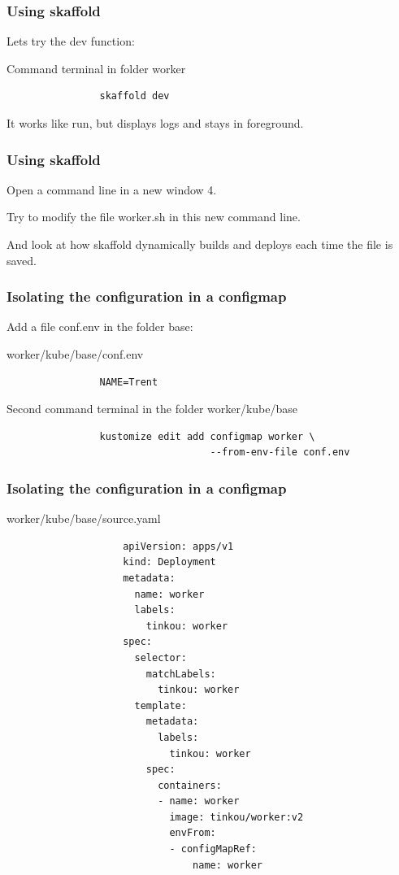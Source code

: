 	\begin{frame}[fragile]
		\frametitle{Using skaffold}
		
		Lets try the dev function:
		\begin{block}{Command terminal in folder worker}
			\begin{verbatim}
				skaffold dev
			\end{verbatim}					
		\end{block}

		It works like run, but displays logs and stays in foreground.
	\end{frame}
	
	\begin{frame}
		\frametitle{Using skaffold}

		Open a command line in a new window 4.		
		
		Try to modify the file worker.sh in this new command line.
		
		\bigskip
		
		And look at how skaffold dynamically builds and deploys each time the file is saved.
	\end{frame}
	
	\begin{frame}[fragile]
		\frametitle{Isolating the configuration in a configmap}

		Add a file conf.env in the folder base:
		\begin{block}{worker/kube/base/conf.env}
			\begin{verbatim}
				NAME=Trent
			\end{verbatim}
		\end{block}				
		
		\begin{block}{Second command terminal in the folder worker/kube/base}
			\begin{verbatim}
				kustomize edit add configmap worker \
				                   --from-env-file conf.env
			\end{verbatim}
		\end{block}
	\end{frame}

	\begin{frame}[fragile]
		\frametitle{Isolating the configuration in a configmap}

		\begin{block}{worker/kube/base/source.yaml}
			\begin{tiny}
				\begin{verbatim}
					apiVersion: apps/v1
					kind: Deployment
					metadata:
					  name: worker
					  labels:
					    tinkou: worker
					spec:
					  selector:
					    matchLabels:
					      tinkou: worker
					  template:
					    metadata:
					      labels:
					        tinkou: worker
					    spec:
					      containers:
					      - name: worker
					        image: tinkou/worker:v2
					        envFrom:
					        - configMapRef:
					            name: worker
				\end{verbatim}
			\end{tiny}			
		\end{block}
	\end{frame}
	
